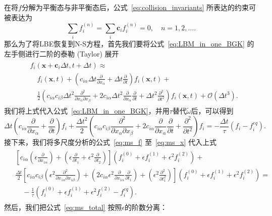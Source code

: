 在将$f$分解为平衡态与非平衡态后，公式~\ref{eq:collision_invariants} 所表达的约束可被表达为
\begin{equation}
    \sum_{i} f_{i}^{(n)}=\sum_{i} \mathbf{c}_{i} f_{i}^{(n)}=0, \quad  n=1,2, \ldots.
\end{equation}
那么为了将LBE恢复到N-S方程，首先我们要将公式~\ref{eq:LBM_in_one_BGK} 的左手侧进行二阶的泰勒 (Taylor) 展开
\begin{align}
    \begin{split}
        & f_{i}\left(\boldsymbol{x}+\mathbf{c}_{i} \Delta t, t+\Delta t\right) \approx \\
        & \quad f_{i}(\boldsymbol{x}, t)+\left({c}_{i \alpha} \Delta t \frac{\partial}{\partial x_{\alpha}}+\Delta t \frac{\partial}{\partial t}\right) f_{i}(\boldsymbol{x}, t)+ \\
        & \quad \frac{1}{2}\left({c}_{i \alpha} {c}_{i \beta} \Delta t^{2} \frac{\partial^{2}}{\partial x_{\alpha} \partial x_{\beta}}+2 {c}_{i \alpha} \Delta t^{2} \frac{\partial}{\partial x_{\alpha}} \frac{\partial}{\partial t}+\Delta t^{2} \frac{\partial^{2}}{\partial t^{2}}\right) f_{i}(\boldsymbol{x}, t)+\mathcal{O}\left(\Delta t^{3}\right) .
    \end{split}
    \label{eq:ms_taylor}
\end{align}
我们将上式代入公式~\ref{eq:LBM_in_one_BGK}，并用$\tau$替代$\tilde{\omega}$后，可以得到
\begin{equation}
\Delta t\left({c}_{i \alpha} \frac{\partial}{\partial x_{\alpha}}+\frac{\partial}{\partial t}\right) f_{i}+\frac{\Delta t^{2}}{2}\left({c}_{i \alpha} {c}_{i \beta} \frac{\partial^{2}}{\partial x_{\alpha} \partial x_{\beta}}+2 {c}_{i \alpha} \frac{\partial}{\partial x_{\alpha}} \frac{\partial}{\partial t}+\frac{\partial^{2}}{\partial t^{2}}\right) f_{i}=-\frac{\Delta t}{\tau}\left(f_{i}-f_{i}^{e q}\right) .
\end{equation}
接下来，我们将多尺度分析的公式~\ref{eq:ms_f} 至~\ref{eq:ms_x} 代入上式
\begin{align}
    \begin{split}
& {\left[{c}_{i \alpha}\left(\epsilon \frac{\partial}{\partial x_{1 \alpha}}\right)+\left(\epsilon \frac{\partial}{\partial t_{1}}+\epsilon^{2} \frac{\partial}{\partial t_{2}}\right)\right]\left(f_{i}^{(0)}+\epsilon f_{i}^{(1)}+\epsilon^{2} f_{i}^{(2)}\right)+} \\
& \frac{\Delta t}{2}\left[{c}_{i \alpha} {c}_{i \beta}\left(\epsilon^{2} \frac{\partial^{2}}{\partial x_{1 \alpha} \partial x_{1 \beta}}\right)+\left(2 {c}_{i \alpha} \epsilon^{2} \frac{\partial}{\partial x_{1 \alpha}} \frac{\partial}{\partial t_{1}}\right)+\left(\epsilon^{2} \frac{\partial^{2}}{\partial t_{1}^{2}}\right)\right]\left(f_{i}^{(0)}+\epsilon f_{i}^{(1)}+\epsilon^{2} f_{i}^{(2)}\right)= \\
& \quad-\frac{1}{\tau}\left(f_{i}^{(0)}+\epsilon f_{i}^{(1)}+\epsilon^{2} f_{i}^{(2)}-f_{i}^{e q}\right) .
    \end{split}
    \label{eq:ms_total}
\end{align}
然后，我们把公式~\ref{eq:ms_total} 按照$\epsilon$的阶数分离：

